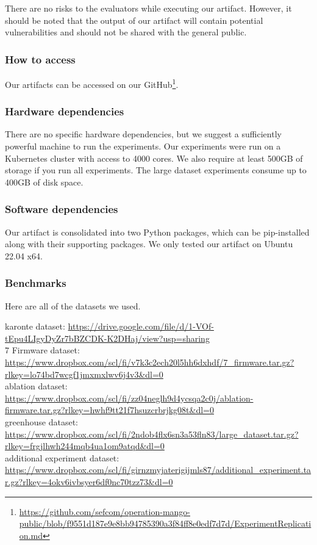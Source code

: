 There are no risks to the evaluators while executing our artifact.
However, it should be noted that the output of our artifact will contain potential vulnerabilities and should not be shared with the general public.

\subsubsection{How to access}
Our artifacts can be accessed on our GitHub\footnote{\url{https://github.com/sefcom/operation-mango-public/blob/f9551d187e9e8bb94785390a3f84ff8e0edf7d7d/ExperimentReplication.md}}.

\subsubsection{Hardware dependencies}
There are no specific hardware dependencies, but we suggest a sufficiently powerful machine to run the experiments.
Our experiments were run on a Kubernetes cluster with access to 4000 cores.
We also require at least 500GB of storage if you run all experiments.
The large dataset experiments consume up to 400GB of disk space.

\subsubsection{Software dependencies}
Our artifact is consolidated into two Python packages, which can be pip-installed along with their supporting packages.
We only tested our artifact on Ubuntu 22.04 x64.

\subsubsection{Benchmarks}
Here are all of the datasets we used.

karonte dataset: \url{https://drive.google.com/file/d/1-VOf-tEpu4LIgyDyZr7bBZCDK-K2DHaj/view?usp=sharing} \\
7 Firmware dataset: \url{https://www.dropbox.com/scl/fi/v7k3c2ech20l5hh6dxhdf/7_firmware.tar.gz?rlkey=lo74bd7wcgf1jmxmxlwv6j4v3&dl=0} \\
ablation dataset: \url{https://www.dropbox.com/scl/fi/zz04neglh9d4ycsqa2c0j/ablation-firmware.tar.gz?rlkey=hwhf9tt21f7hsuzcrbrjkg08t&dl=0} \\
greenhouse dataset: \url{https://www.dropbox.com/scl/fi/2ndob4flx6sn3a53fln83/large_dataset.tar.gz?rlkey=frgjlhwh244mqb4ua1om9atqd&dl=0} \\
additional experiment dataset: \url{https://www.dropbox.com/scl/fi/girnzmyjaterigijmls87/additional_experiment.tar.gz?rlkey=4okv6ivbsyer6df0nc70tzz73&dl=0} \\



